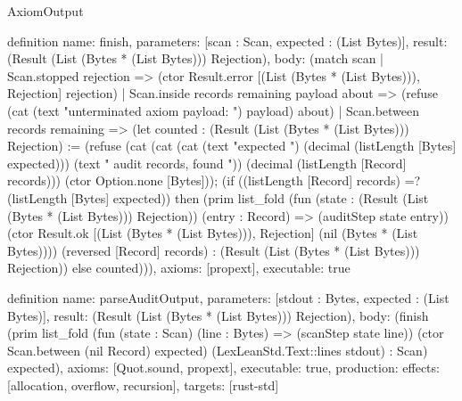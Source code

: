 \begin{lexlean}{AxiomOutput}
\begin{semanticmodule}
definition{
  name: finish,
  parameters: [scan : Scan, expected : (List Bytes)],
  result: (Result (List (Bytes * (List Bytes))) Rejection),
  body: (match scan
    | Scan.stopped rejection => (ctor Result.error [(List (Bytes * (List Bytes))), Rejection] rejection)
    | Scan.inside records remaining payload about => (refuse (cat (text "unterminated axiom payload: ") payload) about)
    | Scan.between records remaining => (let counted : (Result (List (Bytes * (List Bytes))) Rejection) := (refuse (cat (cat (cat (text "expected ") (decimal (listLength [Bytes] expected))) (text " audit records, found ")) (decimal (listLength [Record] records))) (ctor Option.none [Bytes])); (if ((listLength [Record] records) =? (listLength [Bytes] expected)) then (prim list_fold (fun (state : (Result (List (Bytes * (List Bytes))) Rejection)) (entry : Record) => (auditStep state entry)) (ctor Result.ok [(List (Bytes * (List Bytes))), Rejection] (nil (Bytes * (List Bytes)))) (reversed [Record] records) : (Result (List (Bytes * (List Bytes))) Rejection)) else counted))),
  axioms: [propext],
  executable: true
}

definition{
  name: parseAuditOutput,
  parameters: [stdout : Bytes, expected : (List Bytes)],
  result: (Result (List (Bytes * (List Bytes))) Rejection),
  body: (finish (prim list_fold (fun (state : Scan) (line : Bytes) => (scanStep state line)) (ctor Scan.between (nil Record) expected) (LexLeanStd.Text::lines stdout) : Scan) expected),
  axioms: [Quot.sound, propext],
  executable: true,
  production: {effects: [allocation, overflow, recursion], targets: [rust-std]}
}
\end{semanticmodule}
\end{lexlean}
